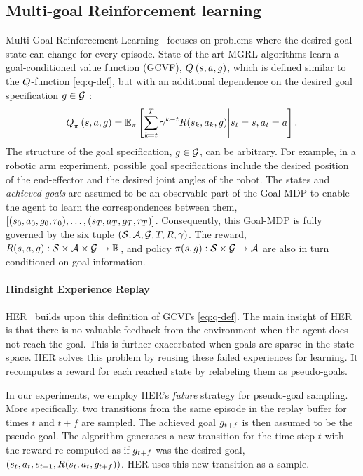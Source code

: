 \subsection{Multi-goal Reinforcement learning}
Multi-Goal Reinforcement Learning~\citep{plappert2018multi} focuses on problems
where the desired goal state can change for every episode.
State-of-the-art MGRL algorithms learn a goal-conditioned value
function (GCVF), $Q_{}^{}\left({s}, {a}, {g}\right)$, which is defined
similar to the $Q$-function \eqref{eq:q-def}, but with an additional
dependence on the desired goal specification $g \in \mathcal{G}$ :
%
\begin{align}
Q_{\pi}^{}\left({s}, {a}, {g}\right) = \mathbb{E}_\pi\left[ \sum_{k=t}^T
  \gamma^{k-t} R(s_k, a_k, g)
  \middle| s_t = s, a_t = a \right] .
  \label{eq:q-def}
\end{align}%
%
The structure of the goal specification, $g \in \mathcal{G}$, can be
arbitrary. For example, in a robotic
arm experiment, possible goal specifications include the desired position of the
end-effector and the desired joint angles of the robot.
The states and \emph{achieved goals} are assumed to be an observable part of the
Goal-MDP to enable the agent to learn the correspondences between them,
$[(s_0, a_0,
g_0, r_0), \dots, (s_T, a_T, g_T, r_T)]$.
Consequently, this Goal-MDP is fully governed by the six tuple $(\mathcal{S},
\mathcal{A},\mathcal{G}, T, R, \gamma)$. The reward, $R(s,a,
g) : \mathcal{S} \times \mathcal{A}\times \mathcal{G} \rightarrow \mathbb{R} $, and policy
$\pi(s, g): \mathcal{S} \times \mathcal{G} \rightarrow \mathcal{A} $ are
also in turn conditioned on goal information.


\paragraph{Hindsight Experience Replay}
HER~\citep{andrychowicz2017hindsight}
builds upon this definition of GCVFs \eqref{eq:q-def}.  The main insight of HER is that there is
no valuable feedback from the environment when the agent does not reach
the goal. This is further exacerbated when goals are
sparse in the state-space. 
HER solves this problem by reusing these failed experiences for learning.
It recomputes a reward for each reached state by relabeling them as pseudo-goals.

In our experiments, we employ HER's \emph{future} strategy for
pseudo-goal sampling. More specifically, two transitions
from the same episode in the replay buffer for times $t$ and $t+f$ are
sampled.
The achieved goal $g_{t+f}$ is then assumed to be the pseudo-goal.
The algorithm generates a new transition for the time step $t$
with the reward re-computed as if $g_{t+f}$ was the desired goal,
$(s_{t}, a_t, s_{t+1}, R(s_t, a_t, g_{t+f}))$.
HER uses this new transition as a sample.



